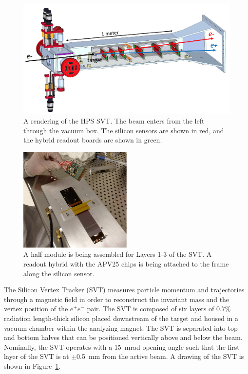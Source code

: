 \begin{figure}[htb]
  \centering
      \includegraphics[width=1.0\textwidth]{pics/experiment/svt.png}
  \caption[Rendering of the HPS SVT]{A rendering of the HPS SVT. The beam enters from the left through the vacuum box. The silicon sensors are shown in red, and the hybrid readout boards are shown in green.}
  \label{Figure:svt}
\end{figure}

\begin{figure}[h]
  \centering
      \includegraphics[width=0.5\textwidth]{pics/experiment/svtSensorAssembly.png}
  \caption[Assembly of a half module of the SVT ]{A half module is being assembled for Layers 1-3 of the SVT. A readout hybrid with the APV25 chips is being attached to the frame along the silicon sensor.~\cite{collaboration_heavy_2013}}
  \label{Figure:svtAssembly}
\end{figure}

The Silicon Vertex Tracker (SVT) measures particle momentum and trajectories through a magnetic field in order to reconstruct the invariant mass and the vertex position of the $e^+e^-$ pair. The SVT is composed of six layers of 0.7$\%$ radiation length-thick silicon placed downstream of the target and housed in a vacuum chamber within the analyzing magnet. The SVT is separated into top and bottom halves that can be positioned vertically above and below the beam. Nominally, the SVT operates with a 15~mrad opening angle such that the first layer of the SVT is at $\pm$0.5~mm from the active beam. A drawing of the SVT is shown in Figure~\ref{Figure:svt}.

